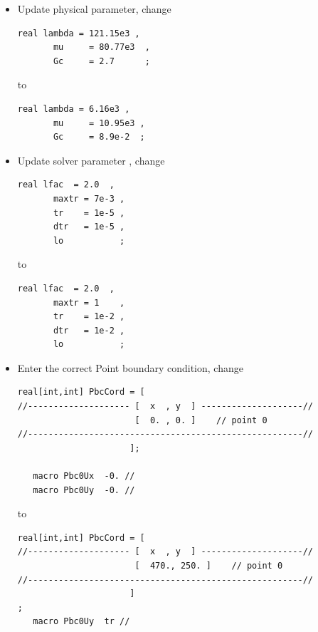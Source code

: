 \begin{itemize}

\item Update physical parameter, change

\begin{lstlisting}[style=CppStyle]
  real lambda = 121.15e3 ,
       mu     = 80.77e3  ,
       Gc     = 2.7      ;
\end{lstlisting}

to

\begin{lstlisting}[style=CppStyle]
  real lambda = 6.16e3 ,
       mu     = 10.95e3 ,
       Gc     = 8.9e-2  ;
\end{lstlisting}

\item Update solver parameter , change

\begin{lstlisting}[style=CppStyle]
  real lfac  = 2.0  ,
       maxtr = 7e-3 ,
       tr    = 1e-5 ,
       dtr   = 1e-5 ,
       lo           ;
\end{lstlisting}

to

\begin{lstlisting}[style=CppStyle]
  real lfac  = 2.0  ,
       maxtr = 1    ,
       tr    = 1e-2 ,
       dtr   = 1e-2 ,
       lo           ;
\end{lstlisting}


\item Enter the correct Point boundary condition, change

\begin{lstlisting}[style=CppStyle]
  real[int,int] PbcCord = [
//-------------------- [  x  , y  ] --------------------//
                       [  0. , 0. ]    // point 0
//------------------------------------------------------//
                      ];

   macro Pbc0Ux  -0. //
   macro Pbc0Uy  -0. //
\end{lstlisting}

to

\begin{lstlisting}[style=CppStyle]
  real[int,int] PbcCord = [
//-------------------- [  x  , y  ] --------------------//
                       [  470., 250. ]    // point 0
//------------------------------------------------------//
                      ]
;
   macro Pbc0Uy  tr //
\end{lstlisting}

\end{itemize}

